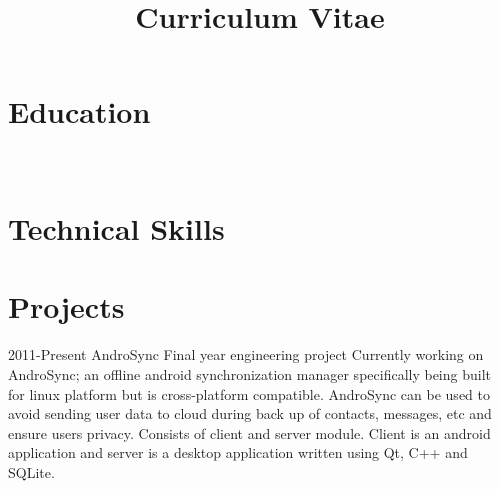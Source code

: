 \documentclass[11pt,a4paper]{moderncv}
\title{Curriculum Vitae}               %
\begin{document}
\maketitle


\section{Education}
\\



\vspace{.4in}\section{Technical Skills} 
 {}{}



\section{Projects}
\cventry
{2011-Present}
{AndroSync}
{Final year engineering project}
{}
{}
{Currently working on AndroSync; an offline android synchronization manager specifically being built for linux platform but is cross-platform 
compatible. AndroSync can be used to avoid sending user data to cloud during back up of contacts, messages, etc and ensure users privacy. 
Consists of client and server module. Client is an android application and server is a desktop application written using Qt, C++ and SQLite.}
\end{document}
